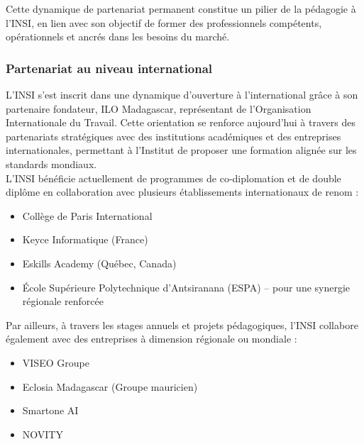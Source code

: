\documentclass[a4paper,12pt, oneside]{article}
\begin{document}
Cette dynamique de partenariat permanent constitue un pilier de la pédagogie à l’INSI, en lien avec son objectif de former des professionnels compétents, opérationnels et ancrés dans les besoins du marché.\\

\subsubsection{Partenariat au niveau international} 
L’INSI s’est inscrit dans une dynamique d’ouverture à l’international grâce à son partenaire fondateur, ILO Madagascar, représentant de l’Organisation Internationale du Travail. Cette orientation se renforce aujourd’hui à travers des partenariats stratégiques avec des institutions académiques et des entreprises internationales, permettant à l’Institut de proposer une formation alignée sur les standards mondiaux.\\

L’INSI bénéficie actuellement de programmes de co-diplomation et de double diplôme en collaboration avec plusieurs établissements internationaux de renom :
\begin{itemize}
    \item Collège de Paris International
    \item Keyce Informatique (France)
    \item Eskills Academy (Québec, Canada)
    \item École Supérieure Polytechnique d’Antsiranana (ESPA) – pour une synergie régionale renforcée
\end{itemize}

Par ailleurs, à travers les stages annuels et projets pédagogiques, l’INSI collabore également avec des entreprises à dimension régionale ou mondiale :
\begin{itemize}
    \item VISEO Groupe
    \item Eclosia Madagascar (Groupe mauricien)
    \item Smartone AI
    \item NOVITY
\end{itemize}
\end{document}
